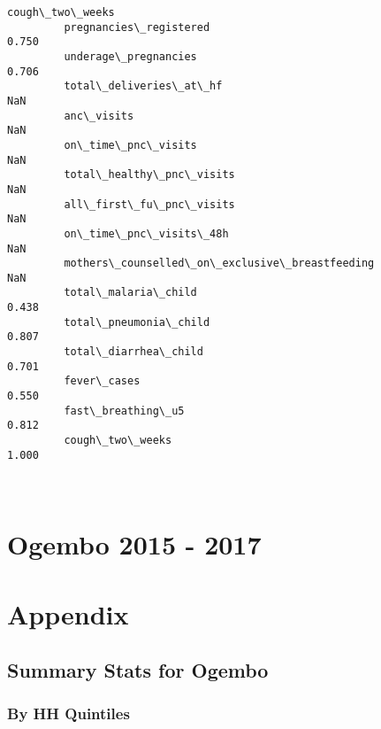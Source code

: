 \documentclass[11pt]{article}
\begin{document}
\begin{Verbatim}[commandchars=\\\{\}]
                                                        cough\_two\_weeks  
         pregnancies\_registered                                   0.750  
         underage\_pregnancies                                     0.706  
         total\_deliveries\_at\_hf                                     NaN  
         anc\_visits                                                 NaN  
         on\_time\_pnc\_visits                                         NaN  
         total\_healthy\_pnc\_visits                                   NaN  
         all\_first\_fu\_pnc\_visits                                    NaN  
         on\_time\_pnc\_visits\_48h                                     NaN  
         mothers\_counselled\_on\_exclusive\_breastfeeding              NaN  
         total\_malaria\_child                                      0.438  
         total\_pneumonia\_child                                    0.807  
         total\_diarrhea\_child                                     0.701  
         fever\_cases                                              0.550  
         fast\_breathing\_u5                                        0.812  
         cough\_two\_weeks                                          1.000  
\end{Verbatim}
            
    \begin{center}
    \end{center}
    { \hspace*{\fill} \\}
    
    \section{Ogembo 2015 - 2017}\label{ogembo-2015---2017}

    \section{Appendix}\label{appendix}

    \subsection{Summary Stats for Ogembo}\label{summary-stats-for-ogembo}

    \subsubsection{By HH Quintiles}\label{by-hh-quintiles}
\end{document}
